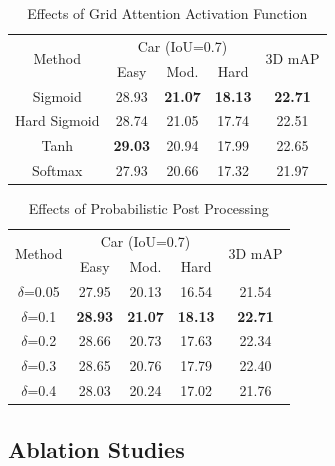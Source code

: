 \documentclass[journal]{IEEEtran}
\begin{document}
	\begin{table}[]
		\centering
		\caption{Effects of Grid Attention Activation Function}
		\label{tab:grid attention activate function}
		{%
			\begin{tabular}{ccccc}
				\hline
				\multirow{2}{*}{{Method}} & \multicolumn{3}{c}{{Car (IoU=0.7)}} & \multirow{2}{*}{3D mAP} \\ \cmidrule{2-4}
				& Easy  & Mod.  & Hard  &       \\ \hline
				Sigmoid 		& {28.93} & \textbf{21.07} 		&\textbf{18.13} & \textbf{22.71} 	\\
				Hard Sigmoid 	& 28.74 & 21.05 & 17.74 & 22.51 	\\
				Tanh 			& \textbf{29.03} & 20.94 & 17.99 & {22.65}  	\\
				Softmax			& 27.93 & 20.66 & 17.32 & {21.97}  	\\ \hline
			\end{tabular}%
		}
	\end{table}
	
	\begin{table}[]
		\centering
		\caption{Effects of Probabilistic Post Processing}
		\label{tab:ppp module}
		{%
			\begin{tabular}{ccccc}
				\hline
				\multirow{2}{*}{{Method}} & \multicolumn{3}{c}{{Car (IoU=0.7)}} & \multirow{2}{*}{3D mAP} \\ \cmidrule{2-4}
				& Easy  & Mod.  & Hard  &       \\ \hline
				$\delta$=0.05 		& {27.95} & {20.13} 		&{16.54} & {21.54}  	\\
				$\delta$=0.1 		& \textbf{28.93} & \textbf{21.07} 		&\textbf{18.13} & \textbf{22.71}  	\\
				$\delta$=0.2 		& 28.66 & 20.73 & 17.63 & 22.34 	\\
				$\delta$=0.3  		& 28.65 & 20.76 & 17.79 & 22.40  	\\
				$\delta$=0.4 		& 28.03 & 20.24 & 17.02 & 21.76  	\\ \hline
			\end{tabular}%
		}
	\end{table}
	
	\subsection{Ablation Studies}
\end{document}
